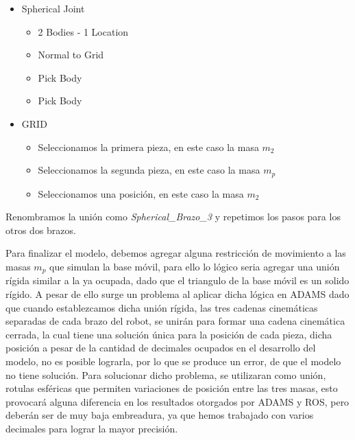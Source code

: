        \begin{scope}
            \renewcommand{\labelitemi}{\blacklozenge}
            \renewcommand{\labelitemii}{\checkmark}
            \begin{itemize}
                \item Spherical Joint
                \begin{itemize}
                    \item 2 Bodies - 1 Location
                    \item Normal to Grid
                    \item Pick Body
                    \item Pick Body
                \end{itemize}
                \item GRID 
                \begin{itemize}
                    \item Seleccionamos la primera pieza, en este caso la masa $m_{2}$
                    \item Seleccionamos la segunda pieza, en este caso la masa $m_{p}$
                    \item Seleccionamos una posición, en este caso la masa $m_{2}$
                \end{itemize}
            \end{itemize}
        \end{scope}
        
        Renombramos la unión como \textit{Spherical\_Brazo\_3} y repetimos los pasos para los otros dos brazos.
        
        Para finalizar el modelo, debemos agregar alguna restricción de movimiento a las masas $m_{p}$ que simulan la base móvil, para ello lo lógico seria agregar una unión rígida similar a la ya ocupada, dado que el triangulo de la base móvil es un solido rígido. A pesar de ello surge un problema al aplicar dicha lógica en ADAMS dado que cuando establezcamos dicha unión rígida, las tres cadenas cinemáticas separadas de cada brazo del robot, se unirán para formar una cadena cinemática cerrada, la cual tiene una solución única para la posición de cada pieza, dicha posición a pesar de la cantidad de decimales ocupados en el desarrollo del modelo, no es posible lograrla, por lo que se produce un error, de que el modelo no tiene solución. Para solucionar dicho problema, se utilizaran como unión, rotulas esféricas que permiten variaciones de posición entre las tres masas, esto provocará alguna diferencia en los resultados otorgados por ADAMS y ROS, pero deberán ser de muy baja embreadura, ya que hemos trabajado con varios decimales para lograr la mayor precisión.
        

